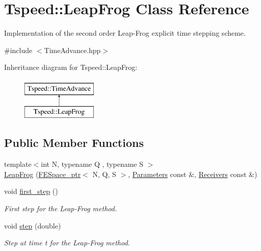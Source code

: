 \hypertarget{classTspeed_1_1LeapFrog}{\section{Tspeed\-:\-:Leap\-Frog Class Reference}
\label{classTspeed_1_1LeapFrog}
}


Implementation of the second order Leap-\/\-Frog explicit time stepping scheme.  




{\ttfamily \#include $<$Time\-Advance.\-hpp$>$}

Inheritance diagram for Tspeed\-:\-:Leap\-Frog\-:\begin{figure}[H]
\begin{center}
\leavevmode
\includegraphics[height=2.000000cm]{classTspeed_1_1LeapFrog}
\end{center}
\end{figure}
\subsection*{Public Member Functions}
\begin{DoxyCompactItemize}
\item 
{\footnotesize template$<$int N, typename Q , typename S $>$ }\\\hyperlink{classTspeed_1_1LeapFrog_a444fa2e71465a70a4be750395d4e6908}{Leap\-Frog} (\hyperlink{namespaceTspeed_a05fcb57094666c8f5ab1e90d1a6fecf8}{F\-E\-Space\-\_\-ptr}$<$ N, Q, S $>$, \hyperlink{classTspeed_1_1Parameters}{Parameters} const \&, \hyperlink{classTspeed_1_1Receivers}{Receivers} const \&)
\item 
void \hyperlink{classTspeed_1_1LeapFrog_aad6f9246550ac8dda3d8b00fc713604b}{first\-\_\-step} ()
\begin{DoxyCompactList}\small\item\em First step for the Leap-\/\-Frog method. \end{DoxyCompactList}\item 
void \hyperlink{classTspeed_1_1LeapFrog_a571d3a80ef86424a14b562295aaae52e}{step} (double)
\begin{DoxyCompactList}\small\item\em Step at time t for the Leap-\/\-Frog method. \end{DoxyCompactList}\end{DoxyCompactItemize}
